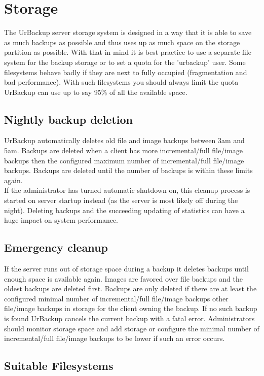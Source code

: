 \documentclass[a4paper,10pt]{article}
\begin{document}
\section{Storage}

The UrBackup server storage system is designed in a way that it is able to save as much backups as possible and thus uses up as much space on the storage partition as possible. With that in mind it is best practice to use a separate file system for the backup storage or to set a quota for the 'urbackup' user. Some filesystems behave badly if they are next to fully occupied (fragmentation and bad performance). With such filesystems you should always limit the quota UrBackup can use up to say 95\% of all the available space.

\subsection{Nightly backup deletion}

UrBackup automatically deletes old file and image backups between 3am and 5am. Backups are deleted when a client has more incremental/full file/image backups then the configured maximum number of incremental/full file/image backups. Backups are deleted until the number of backups is within these limits again.\\
If the administrator has turned automatic shutdown on, this cleanup process is started on server startup instead (as the server is most likely off during the night). Deleting backups and the succeeding updating of statistics can have a huge impact on system performance.

\subsection{Emergency cleanup}

If the server runs out of storage space during a backup it deletes backups until enough space is available again. Images are favored over file backups and the oldest backups are deleted first. Backups are only deleted if there are at least the configured minimal number of incremental/full file/image backups other file/image backups in storage for the client owning the backup. If no such backup is found UrBackup cancels the current backup with a fatal error. Administrators should monitor storage space and add storage or configure the minimal number of incremental/full file/image backups to be lower if such an error occurs. 

\subsection{Suitable Filesystems}
\label{subsec_filesystems}
\end{document}
